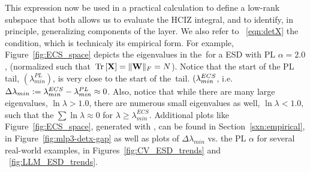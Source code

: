 This expression now be used in a practical calculation to define a low-rank subspace that both allows us to evaluate the HCIZ integral,
and to identify, in principle, generalizing components of the layer.
We also refer to \EQN~\ref{eqn:detX} the \TRACELOG condition, which is technicaly its empirical form.
For example, Figure~\ref{fig:ECS_space} depicts the eigenvalues in the~\ECS for a \Typical ESD with PL $\alpha=2.0$,
(normalized such that $\mbox{}\operatorname{Tr}\left[\mathbf{X}\right]=\Vert\mathbf{W}\Vert_{F}=N$).
Notice that the start of the PL tail,  $(\lambda_{min}^{PL})$, is very close to the start of the~\ECS tail. $(\lambda^{ECS}_{min}$,
i.e. $\Delta \lambda_{min}:=\lambda^{ECS}_{min}-\lambda^{PL}_{min}\approx 0$.
Also, notice that while there are many large eigenvalues, $\ln\lambda>1.0$, there are numerous small eigenvalues as well,
$\ln\lambda<1.0$, such that the $\sum\ln\lambda\approx 0$ for $\lambda\ge\lambda_{min}^{ECS}$.
Additional plots like Figure~\ref{fig:ECS_space}, generated with \WW,  can be found in Section~\ref{sxn:empirical},
in Figure~\ref{fig:mlp3-detx-gap}
as well as plots of $\Delta \lambda_{min}$ vs. the \WW PL $\alpha$ for several real-world examples,
in Figures~\ref{fig:CV_ESD_trends} and ~\ref{fig:LLM_ESD_trends}.

